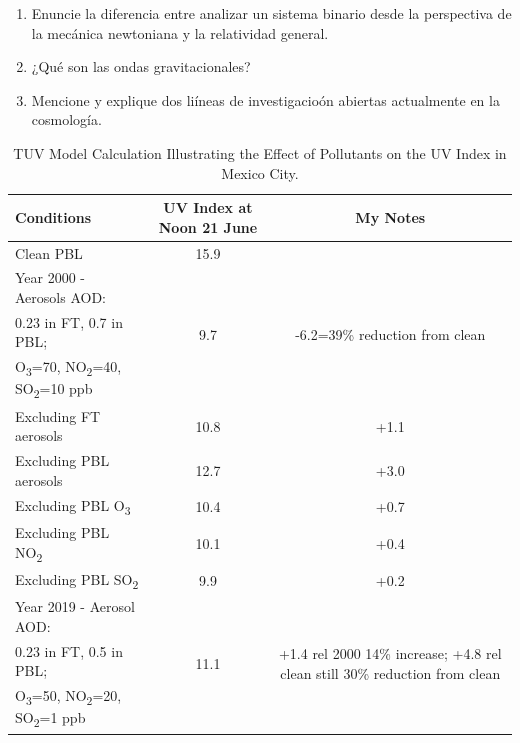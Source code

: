 \documentclass[12pt,letterpaper]{report}
\begin{document}
\begin{enumerate}
    \item Enuncie la diferencia entre analizar un sistema binario desde la perspectiva de la mecánica newtoniana y la relatividad general.
    \item ¿Qué son las ondas gravitacionales?
    \item Mencione y explique dos liíneas de investigacioón abiertas actualmente en la cosmología.
\end{enumerate}
    \begin{table}[H]
        \centering
        \begin{tabular}{lcc} \hline
        \textbf{Conditions} & \textbf{UV Index at Noon 21 June} & \textbf{My Notes} \\ \hline
        Clean PBL & 15.9 & \\ \hline
        Year 2000 - Aerosols AOD:&\multirow{3}{*}{9.7}& \multirow{3}{5cm}{-6.2=39\% reduction from clean} \\ 0.23 in FT, 0.7 in PBL;\\ O\textsubscript{3}=70, NO\textsubscript{2}=40, SO\textsubscript{2}=10 ppb\\ \hline
        Excluding FT aerosols & 10.8 & +1.1 \\\hline
        Excluding PBL aerosols & 12.7 & +3.0 \\\hline
        Excluding PBL O\textsubscript{3} & 10.4 & +0.7 \\\hline
        Excluding PBL NO\textsubscript{2} & 10.1 & +0.4 \\\hline
        Excluding PBL SO\textsubscript{2} & 9.9 & +0.2\\\hline
        Year 2019 - Aerosol AOD: & \multirow{3}{*}{11.1} & \multirow{3}{5cm}{+1.4 rel 2000 14\% increase; +4.8 rel clean still 30\% reduction from clean}\\
        0.23 in FT, 0.5 in PBL;\\ O\textsubscript{3}=50, NO\textsubscript{2}=20, SO\textsubscript{2}=1 ppb\\ \hline
        \end{tabular}
        \caption{TUV Model Calculation Illustrating the Effect of Pollutants on the UV Index in Mexico City.}
        \label{table:TUVmodel}
        \end{table}
\end{document}
